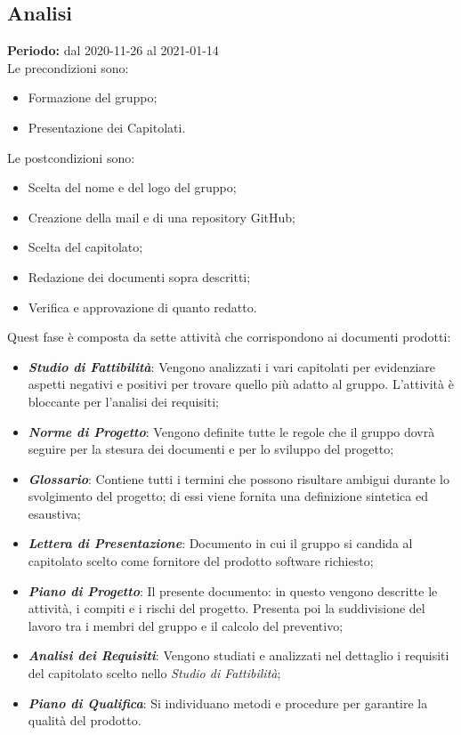 \subsection{Analisi}

\textbf{Periodo:} dal 2020-11-26 al 2021-01-14
\\ Le precondizioni sono:
\begin{itemize}
    \item Formazione del gruppo;
    \item Presentazione dei Capitolati.
\end{itemize}

Le postcondizioni sono:

\begin{itemize}
    \item Scelta del nome e del logo del gruppo;
    \item Creazione della mail e di una repository GitHub;
    \item Scelta del capitolato;
    \item Redazione dei documenti sopra descritti;
    \item Verifica e approvazione di quanto redatto.
\end{itemize}


Quest fase è composta da sette attività che corrispondono ai documenti prodotti:
\begin{itemize}
    \item \textbf{\textit{Studio di Fattibilità}}: Vengono analizzati i vari capitolati per evidenziare aspetti
negativi e positivi per trovare quello più adatto al gruppo. L'attività è bloccante per l'analisi dei requisiti;

    \item \textbf{\textit{Norme di Progetto}}: Vengono definite tutte le regole che il gruppo
\Gruppo dovrà seguire per la stesura dei documenti e per lo sviluppo del progetto;

    \item \textbf{\textit{Glossario}}: Contiene tutti i termini che possono risultare ambigui durante
lo svolgimento del progetto; di essi viene fornita una definizione sintetica ed esaustiva;

    \item \textbf{\textit{Lettera di Presentazione}}: Documento in cui il gruppo \Gruppo si candida al capitolato
scelto come fornitore del prodotto software richiesto;

    \item \textbf{\textit{Piano di Progetto}}: Il presente documento: in questo vengono descritte le attività,
i compiti e i rischi del progetto. Presenta poi la suddivisione del lavoro tra i membri del gruppo \Gruppo e il calcolo del preventivo;

    \item \textbf{\textit{Analisi dei Requisiti}}: Vengono studiati e analizzati nel dettaglio i requisiti del capitolato scelto nello \textit{Studio di Fattibilità};

    \item \textbf{\textit{Piano di Qualifica}}: Si individuano metodi e procedure per garantire la qualità del prodotto.
\end{itemize}

